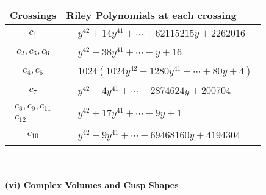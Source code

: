 \documentclass[1p]{elsarticle_modified}
\theoremstyle{definition}
\begin{document}
\begin{tabular}{m{50pt}|m{274pt}}
Crossings & \hspace{64pt}Riley Polynomials at each crossing \\
\hline $$\begin{aligned}c_{1}\end{aligned}$$&$\begin{aligned}
&y^{42}+14 y^{41}+\cdots+62115215 y+2262016
\end{aligned}$\\
\hline $$\begin{aligned}c_{2},c_{3},c_{6}\end{aligned}$$&$\begin{aligned}
&y^{42}-38 y^{41}+\cdots- y+16
\end{aligned}$\\
\hline $$\begin{aligned}c_{4},c_{5}\end{aligned}$$&$\begin{aligned}
&1024(1024 y^{42}-1280 y^{41}+\cdots+80 y+4)
\end{aligned}$\\
\hline $$\begin{aligned}c_{7}\end{aligned}$$&$\begin{aligned}
&y^{42}-4 y^{41}+\cdots-2874624 y+200704
\end{aligned}$\\
\hline $$\begin{aligned}c_{8},c_{9},c_{11}\\c_{12}\end{aligned}$$&$\begin{aligned}
&y^{42}+17 y^{41}+\cdots+9 y+1
\end{aligned}$\\
\hline $$\begin{aligned}c_{10}\end{aligned}$$&$\begin{aligned}
&y^{42}-9 y^{41}+\cdots-69468160 y+4194304
\end{aligned}$\\
\hline
\end{tabular}\\~\\
\newpage\flushleft \textbf{(vi) Complex Volumes and Cusp Shapes}
\end{document}
